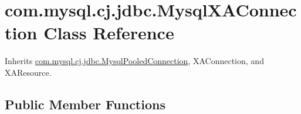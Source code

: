 \hypertarget{classcom_1_1mysql_1_1cj_1_1jdbc_1_1_mysql_x_a_connection}{}\section{com.\+mysql.\+cj.\+jdbc.\+Mysql\+X\+A\+Connection Class Reference}
\label{classcom_1_1mysql_1_1cj_1_1jdbc_1_1_mysql_x_a_connection}


Inherits \mbox{\hyperlink{classcom_1_1mysql_1_1cj_1_1jdbc_1_1_mysql_pooled_connection}{com.\+mysql.\+cj.\+jdbc.\+Mysql\+Pooled\+Connection}}, X\+A\+Connection, and X\+A\+Resource.

\subsection*{Public Member Functions}
